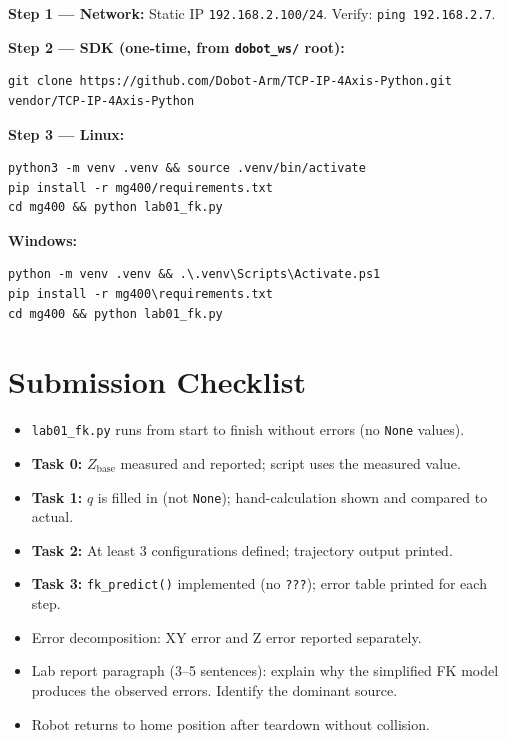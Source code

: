 \documentclass[11pt,a4paper]{article}
\begin{document}
\begin{tcolorbox}[setupbox, title={MG400 --- Environment Setup}]
\textbf{Step 1 --- Network:} Static IP \texttt{192.168.2.100/24}. Verify: \texttt{ping 192.168.2.7}.

\textbf{Step 2 --- SDK (one-time, from \texttt{dobot\_ws/} root):}
\begin{lstlisting}[style=BashStyle]
git clone https://github.com/Dobot-Arm/TCP-IP-4Axis-Python.git vendor/TCP-IP-4Axis-Python
\end{lstlisting}

\textbf{Step 3 --- Linux:}
\begin{lstlisting}[style=BashStyle]
python3 -m venv .venv && source .venv/bin/activate
pip install -r mg400/requirements.txt
cd mg400 && python lab01_fk.py
\end{lstlisting}

\textbf{Windows:}
\begin{lstlisting}[style=BashStyle]
python -m venv .venv && .\.venv\Scripts\Activate.ps1
pip install -r mg400\requirements.txt
cd mg400 && python lab01_fk.py
\end{lstlisting}
\end{tcolorbox}

\section{Submission Checklist}

\begin{tcolorbox}[setupbox, title={Submission Checklist}]
\begin{itemize}[label=$\square$]
  \item \texttt{lab01\_fk.py} runs from start to finish without errors (no \texttt{None} values).
  \item \textbf{Task 0:} $Z_{\text{base}}$ measured and reported; script uses the measured value.
  \item \textbf{Task 1:} $q$ is filled in (not \texttt{None}); hand-calculation shown and compared to actual.
  \item \textbf{Task 2:} At least 3 configurations defined; trajectory output printed.
  \item \textbf{Task 3:} \texttt{fk\_predict()} implemented (no \texttt{???}); error table printed for each step.
  \item Error decomposition: XY error and Z error reported separately.
  \item Lab report paragraph (3--5 sentences): explain why the simplified FK model
        produces the observed errors. Identify the dominant source.
  \item Robot returns to home position after teardown without collision.
\end{itemize}
\end{tcolorbox}
\end{document}
